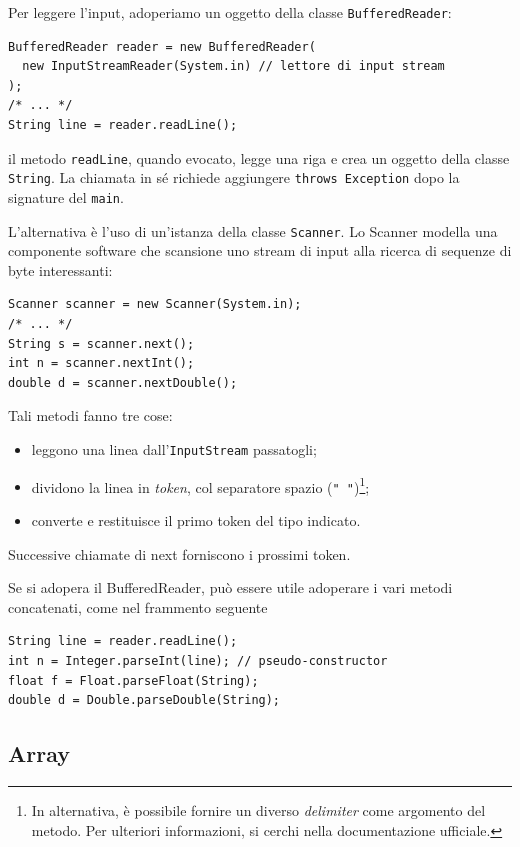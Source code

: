 \documentclass[\fontsizeclass,twocolumn]{\classname}
\theoremstyle{definition}
\theoremstyle{definition}
\begin{document}
Per leggere l'input, adoperiamo un oggetto della classe \texttt{BufferedReader}:

\begin{lstlisting}
BufferedReader reader = new BufferedReader(
  new InputStreamReader(System.in) // lettore di input stream
);
/* ... */
String line = reader.readLine();
\end{lstlisting}

il metodo \texttt{readLine}, quando evocato, legge una riga e crea un oggetto
della classe \texttt{String}. La chiamata in sé richiede aggiungere
\texttt{throws Exception} dopo la signature del \texttt{main}.

L'alternativa è l'uso di un'istanza della classe \texttt{Scanner}. Lo Scanner
modella una componente software che scansione uno stream di input alla ricerca
di sequenze di byte interessanti:

\begin{lstlisting}
Scanner scanner = new Scanner(System.in);
/* ... */
String s = scanner.next();
int n = scanner.nextInt();
double d = scanner.nextDouble();
\end{lstlisting}

Tali metodi fanno tre cose:
\begin{itemize}
    \item leggono una linea dall'\texttt{Input\-Stream} passatogli;
    \item dividono la linea in \emph{token}, col separatore spazio (\texttt{"
        "})\footnote{In alternativa, è possibile fornire un diverso
        \emph{delimiter} come argomento del metodo. Per ulteriori informazioni,
    si cerchi nella documentazione ufficiale.};
    \item converte e restituisce il primo token del tipo indicato.
\end{itemize}
Successive chiamate di next forniscono i prossimi token.

Se si adopera il BufferedReader, può essere utile adoperare i vari metodi
concatenati, come nel frammento seguente

\begin{lstlisting}
String line = reader.readLine();
int n = Integer.parseInt(line); // pseudo-constructor
float f = Float.parseFloat(String);
double d = Double.parseDouble(String);
\end{lstlisting}

\subsection{Array}
\end{document}
